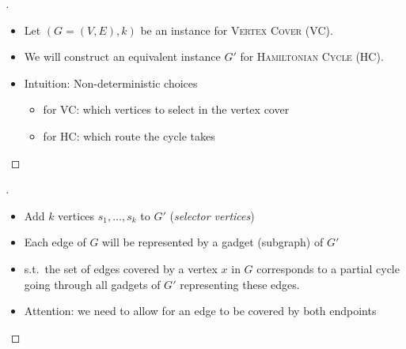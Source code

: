 \begin{frame}
	\begin{proof}[]
		\begin{itemize}
			      \pause
			\item Let $(G=(V,E),k)$ be an instance for \textsc{Vertex Cover} (VC).
			\item We will construct an equivalent instance $G'$ for \textsc{Hamiltonian Cycle} (HC).
			      \pause
			\item Intuition: Non-deterministic choices
			      \begin{itemize}
				      \item for VC: which vertices to select in the vertex cover
				      \item for HC: which route the cycle takes
			      \end{itemize}
		\end{itemize}
		\lecturenotes{\renewcommand{\qed}{\relax}}
		\slides{\dots}
	\end{proof}
\end{frame}


\begin{frame}
	\begin{proof}[]
		\begin{itemize}
			\item Add $k$ vertices $s_1, \dots, s_k$ to $G'$ (\emph{selector vertices})
			      \pause
			\item Each edge of $G$ will be represented by a gadget (subgraph) of $G'$
			\item s.t.\ the set of edges covered by a vertex $x$ in $G$ corresponds to a partial cycle going through all gadgets of $G'$ representing these edges.
			      \pause
			\item Attention: we need to allow for an edge to be covered by both endpoints
		\end{itemize}
		\lecturenotes{\renewcommand{\qed}{\relax}}
		\slides{\dots}
	\end{proof}
\end{frame}


